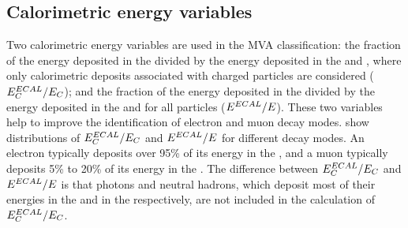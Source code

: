 \subsection{Calorimetric energy variables}

Two calorimetric energy variables are used in the MVA classification: the fraction of the energy  deposited in the \ECAL divided by the  energy deposited in the \ECAL and \HCAL, where only calorimetric deposits associated with charged particles are considered ($E^{ECAL}_{C} / E_{C}$); and the fraction of the energy  deposited in the \ECAL divided by the  energy deposited in the \ECAL and \HCAL for all particles ($E^{ECAL} / E$). These  two variables help to improve the identification of electron and muon decay modes.  show distributions of  $E^{ECAL}_{C} / E_{C}$ and $E^{ECAL} / E$ for different decay modes. An electron typically deposits over 95\% of its energy in the \ECAL, and a muon typically deposits 5\% to 20\% of its energy in the \ECAL. The difference between $E^{ECAL}_{C} / E_{C}$ and  $E^{ECAL} / E$ is that photons and neutral hadrons, which deposit most of their energies in the \ECAL and in the \HCAL respectively, are not included in the calculation of $E^{ECAL}_{C} / E_{C}$.



